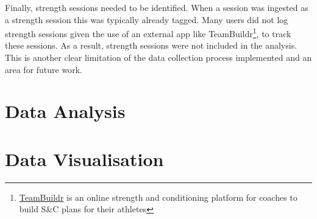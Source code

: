 Finally, strength sessions needed to be identified. When a session was ingested as a strength session this was typically already tagged. Many users did not log strength sessions given the use of an external app like TeamBuildr\footnote{\href{https://www.teambuildr.com/}{TeamBuildr} is an online strength and conditioning platform for coaches to build S\&C plans for their athletes}, to track these sessions. As a result, strength sessions were not included in the analysis. This is another clear limitation of the data collection process implemented and an area for future work.

\section{Data Analysis}


\section{Data Visualisation}